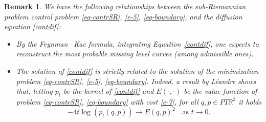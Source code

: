 \documentclass[proc]{edpsmath}
\newtheorem{remark}[theorem]{Remark}
\begin{document}
%

\begin{remark} We have the following relationships between the sub-Riemannian problem control problem \eqref{eq-contrSR}, \eqref{e-5}, \eqref{eq-boundary}, and the diffusion equation \eqref{contdif}:
\begin{itemize}
\item By the Feynman\,--\,Kac formula, integrating Equation~\eqref{contdif},  one expects to reconstruct the most probable missing level curves (among admissible ones).
\item The solution of \eqref{contdif} is strictly related to the solution of  the minimization problem  \eqref{eq-contrSR}, \eqref{e-5}, \eqref{eq-boundary}.
Indeed, a result by L\'eandre \cite{leandre1,leandre2} shows that, letting $p_t$ be the kernel of \eqref{contdif} and $E(\cdot,\cdot)$ be the value function of problem \eqref{eq-contrSR}, \eqref{eq-boundary} with cost \eqref{e-7}, for all $q,p\in PT\mathbb R^2$ it holds
\begin{equation}
  -4t \log(p_t(q,p)) \longrightarrow E(q,p)^2 \quad \text{as } t\to 0.
\end{equation}
\end{itemize}
\end{remark}
\end{document}
